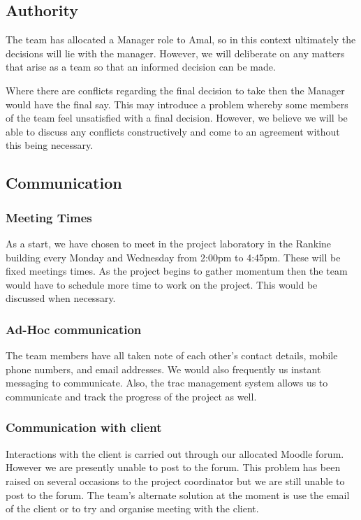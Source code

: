 \documentclass{article}
\begin{document}
\subsection {Authority}

The team has allocated a Manager role to Amal, so in this context ultimately the decisions will lie with the manager. However, we will deliberate on any matters that arise as a team so that an informed decision can be made. 

Where there are conflicts regarding the final decision to take then the
Manager would have the final say. This may introduce a problem whereby some members of the team feel unsatisfied with a final decision. However, we believe we will be able to discuss any conflicts constructively and come to an agreement without this being necessary.

\subsection {Communication}

\subsubsection {Meeting Times}

As a start, we have chosen to meet in the project laboratory in the Rankine building every Monday and Wednesday from 2:00pm to 4:45pm. These will be fixed meetings times. As the project begins to gather momentum then the team would have to schedule more time to work on the project. This would be discussed when necessary.

\subsubsection {Ad-Hoc communication}

The team members have all taken note of each other’s contact details, mobile phone numbers, and email addresses. We would also frequently us instant messaging to communicate. Also, the trac management system allows us to communicate and track the progress of the project as well.

\subsubsection {Communication with client}
Interactions with the client is carried out through our allocated Moodle forum. However we are presently unable to post to the forum. This problem has been raised on several occasions to the project coordinator but we are still unable to post to the forum. The team’s alternate solution at the moment is use the email of the client or to try and organise meeting with the client.
\end{document}

